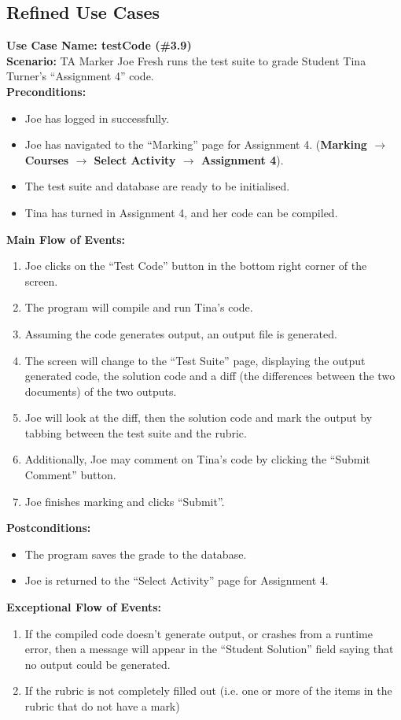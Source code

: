 \documentclass{article}
\begin{document}
\subsection{Refined Use Cases}
\textbf{Use Case Name: testCode (\#3.9)}\\
\textbf{Scenario:}
TA Marker Joe Fresh runs the test suite to grade Student Tina Turner’s “Assignment 4” 
code.\\
\textbf{Preconditions:}
\begin{itemize}
	\item Joe has logged in successfully.
	\item Joe has navigated to the “Marking” page for Assignment 4. (\textbf{Marking 
		$\rightarrow$ Courses $\rightarrow$ Select Activity $\rightarrow$ Assignment 4}).
	\item The test suite  and database are ready to be initialised.
	\item Tina has turned in Assignment 4, and her code can be compiled.
\end{itemize}
\textbf{Main Flow of Events:}
\begin{enumerate} 
	\item Joe clicks on the “Test Code” button in the bottom right corner of the screen.
	\item The program will compile and run Tina’s  code.
	\item Assuming the code generates output, an output file is generated.
	\item The screen will change to the “Test Suite” page, displaying the output 
		generated code, the solution code and a diff (the differences between the 
		two documents) of the two outputs.
	\item Joe will look at the diff, then the solution code and mark the output by
		tabbing between the test suite and the rubric.	
	\item Additionally, Joe may comment on Tina’s code by 	clicking the “Submit 
		Comment” button.
	\item Joe finishes marking and clicks “Submit”.
\end{enumerate}
\textbf{Postconditions:}
\begin{itemize}
\item The program saves the grade to the database. 
\item Joe is returned to the “Select Activity” page for Assignment 4.
\end{itemize}
\textbf{Exceptional Flow of Events:}
\begin{enumerate}
 	\item If the compiled code doesn’t generate output, or crashes from a runtime 
 		error, then a message will appear in the “Student Solution” field saying that  
 		no output could be generated.
	\item If the rubric is not completely filled out (i.e. one or more of the items in the 
		rubric that do not have a mark)
\end{enumerate}
\end{document}
